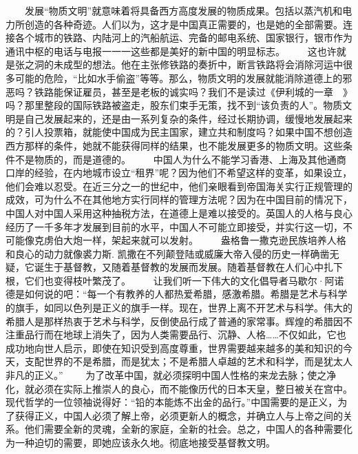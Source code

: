 \documentclass[12pt,oneside]{book}
\begin{document}
\begin{common-format}
　　发展“物质文明”就意味着将具备西方高度发展的物质成果。包括以蒸汽机和电力所创造的各种奇迹。人们以为，这才是中国真正需要的，也是她的全部需要。连接各个城市的铁路、内陆河上的汽船航运、完备的邮电系统、国家银行，银市作为通讯中枢的电话与电报一一一这些都是美好的新中国的明显标志。 
　　这也许就是张之洞的未成型的想法。他在主张修铁路的奏折中，断言铁路将会消除河运中很多可能的危险，“比如水手偷盗”等等。那么，物质文明的发展就能消除道德上的邪恶吗？铁路能保证雇员，甚至是老板的诚实吗？我们不是读过《伊利城的一章　》吗？那里整段的国际铁路被盗走，股东们束手无策，找不到“该负责的人”。物质文明是自己发展起来的，还是由一系列复杂的条件，经过长期协调，缓慢地发展起来的？引人投票箱，就能使中国成为民主国家，建立共和制度吗？如果中国不想创造西方那样的条件，她就不能获得同样的结果，也不能发展更多的物质文明。这些条件不是物质的，而是道德的。 
　　中国人为什么不能学习香港、上海及其他通商口岸的经验，在内地城市设立“租界”呢？因为他们不希望这样的变革，如果设立，他们会难以忍受。在近三分之一的世纪中，他们亲眼看到帝国海关实行正规管理的成效，可为什么不在其他地方实行同样的管理方法呢？因为在中国目前的情况下，中国人对中国人采用这种抽税方法，在道德上是难以接受的。英国人的人格与良心经历了一千多年才发展到目前的水平，中国人不可能立即接受，并实行这一切，不可能像克虏伯大炮一样，架起来就可以发射。 
　　盎格鲁一撒克逊民族培养人格和良心的动力就像裘力斯. 凯撒在不列颠登陆或威廉大帝入侵的历史一样确凿无疑，它诞生于基督教，又随着基督教的发展而发展。随着基督教在人们心中扎下根，它们也变得枝叶繁茂了。 
　　让我们听一下伟大的文化倡导者马歇尔·阿诺德是如何说的吧：“每一个有教养的人都热爱希腊，感激希腊。希腊是艺术与科学的旗手，如同以色列是正义的旗手一样。现在，世界上离不开艺术与科学。伟大的希腊人是那样热衷于艺术与科学，反倒使品行成了普通的家常事。辉煌的希腊因不注重品行而在地球上消失了，因为人类需要品行、沉静、人格……不仅如此，它也成功地向世人启示，即使在知识受到高度尊重，世界需要越来越多的美和知识的今天，支配世界的不是希腊，而是犹太；不是希腊人卓越的艺术和科学，而是犹太人非凡的正义。” 
　　为了改革中国，就必须探明中国人性格的来龙去脉；使之净化，就必须在实际上推崇人的良心，而不能像历代的日本天皇，整日被关在宫中。现代哲学的一位领袖说得好：“铅的本能炼不出金的品行。”中国需要的是正义，为了获得正义，中国人必须了解上帝，必须更新人的概念，并确立人与上帝之间的关系。他们需要全新的灵魂，全新的家庭，全新的社会。总之，中国人的各种需要化为一种迫切的需要，即她应该永久地。彻底地接受基督教文明。 






\end{common-format}
\end{document}
